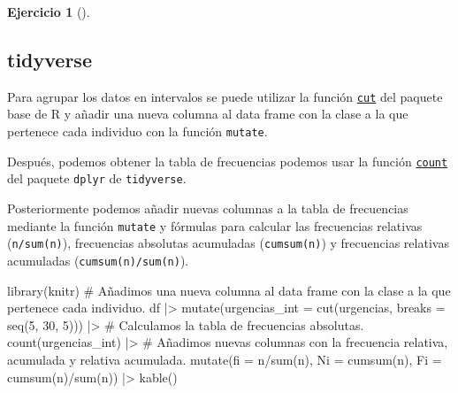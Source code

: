 \documentclass[
  spanish,
  a4paper,
]{scrreport}
\newenvironment{Shaded}{\begin{snugshade}}{\end{snugshade}}
\newcommand{\AttributeTok}[1]{\textcolor[rgb]{0.40,0.45,0.13}{#1}}
\newcommand{\CommentTok}[1]{\textcolor[rgb]{0.37,0.37,0.37}{#1}}
\newcommand{\DecValTok}[1]{\textcolor[rgb]{0.68,0.00,0.00}{#1}}
\newcommand{\FunctionTok}[1]{\textcolor[rgb]{0.28,0.35,0.67}{#1}}
\newcommand{\NormalTok}[1]{\textcolor[rgb]{0.00,0.23,0.31}{#1}}
\newcommand{\SpecialCharTok}[1]{\textcolor[rgb]{0.37,0.37,0.37}{#1}}
\theoremstyle{definition}
\newtheorem{exercise}{Ejercicio}[chapter]
\theoremstyle{remark}
\begin{document}
\begin{exercise}[]
\begin{enumerate}
\begin{tcolorbox}
  \section{tidyverse}

  Para agrupar los datos en intervalos se puede utilizar la función
  \href{https://www.rdocumentation.org/packages/base/versions/3.6.2/topics/cut}{\texttt{cut}}
  del paquete base de R y añadir una nueva columna al data frame con la
  clase a la que pertenece cada individuo con la función
  \texttt{mutate}.

  Después, podemos obtener la tabla de frecuencias podemos usar la
  función
  \href{https://aprendeconalf.es/manual-r/06-preprocesamiento.html\#conteo-del-n\%C3\%BAmero-de-observaciones}{\texttt{count}}
  del paquete \texttt{dplyr} de \texttt{tidyverse}.

  Posteriormente podemos añadir nuevas columnas a la tabla de
  frecuencias mediante la función \texttt{mutate} y fórmulas para
  calcular las frecuencias relativas (\texttt{n/sum(n)}), frecuencias
  absolutas acumuladas (\texttt{cumsum(n)}) y frecuencias relativas
  acumuladas (\texttt{cumsum(n)/sum(n)}).

\begin{Shaded}
\begin{Highlighting}[]
\FunctionTok{library}\NormalTok{(knitr)}
\CommentTok{\# Añadimos una nueva columna al data frame con la clase a la que pertenece cada individuo.}
\NormalTok{df }\SpecialCharTok{|\textgreater{}} \FunctionTok{mutate}\NormalTok{(}\AttributeTok{urgencias\_int =} \FunctionTok{cut}\NormalTok{(urgencias, }\AttributeTok{breaks =} \FunctionTok{seq}\NormalTok{(}\DecValTok{5}\NormalTok{, }\DecValTok{30}\NormalTok{, }\DecValTok{5}\NormalTok{))) }\SpecialCharTok{|\textgreater{}} 
    \CommentTok{\# Calculamos la tabla de frecuencias absolutas.}
    \FunctionTok{count}\NormalTok{(urgencias\_int) }\SpecialCharTok{|\textgreater{}}
    \CommentTok{\# Añadimos nuevas columnas con la frecuencia relativa, acumulada y relativa acumulada.}
    \FunctionTok{mutate}\NormalTok{(}\AttributeTok{fi =}\NormalTok{ n}\SpecialCharTok{/}\FunctionTok{sum}\NormalTok{(n), }\AttributeTok{Ni =} \FunctionTok{cumsum}\NormalTok{(n), }\AttributeTok{Fi =} \FunctionTok{cumsum}\NormalTok{(n)}\SpecialCharTok{/}\FunctionTok{sum}\NormalTok{(n)) }\SpecialCharTok{|\textgreater{}}
    \FunctionTok{kable}\NormalTok{()}
\end{Highlighting}
\end{Shaded}


\end{tcolorbox}
\end{enumerate}
\end{exercise}
\end{document}
